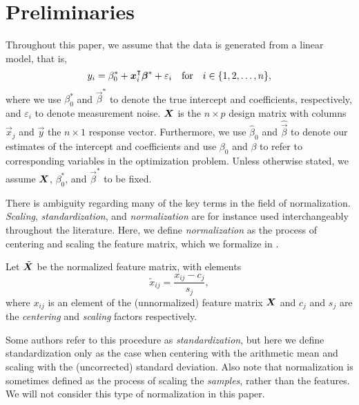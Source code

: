 \section{Preliminaries}

Throughout this paper, we assume that the data is generated from a linear model, that is,
\[
  y_i = \beta_0^* + \boldsymbol x_i^\intercal \boldsymbol\beta^* + \varepsilon_i \quad\text{for}\quad i \in \{1, 2, \dots, n\},
\]
where we use \(\beta_0^*\) and \(\vec\beta^*\) to denote the true intercept and
coefficients, respectively, and \(\varepsilon_i\) to denote measurement noise. \(\boldsymbol X\)
is the \(n \times p\) design matrix with columns \(\vec x_j\) and \(\vec y\) the \(n \times
1\) response vector. Furthermore, we use \(\hat\beta_0\) and \(\hat{\vec{\beta}}\) to
denote our estimates of the intercept and coefficients and use \(\beta_0\) and \(\beta\) to
refer to corresponding variables in the optimization problem. Unless otherwise stated, we
assume \(\boldsymbol{X}\), \(\beta_0^*\), and \(\vec{\beta}^*\) to be fixed.

There is ambiguity regarding many of the key terms in the field of normalization.
\emph{Scaling}, \emph{standardization}, and \emph{normalization} are for instance used
interchangeably throughout the literature. Here, we define \emph{normalization} as the
process of centering and scaling the feature matrix, which we formalize in
.

\begin{definition}[Normalization]
  \label{def:normalization}
  Let \(\tilde{\boldsymbol X}\) be the normalized feature matrix, with elements
  \[
    \tilde{x}_{ij} = \frac{x_{ij} - c_{j}}{s_j},
  \]
  where \(x_{ij}\) is an element of the (unnormalized) feature matrix \(\boldsymbol{X}\) and \(c_j\)
  and \(s_j\) are the \emph{centering} and \emph{scaling} factors respectively.
\end{definition}

Some authors refer to this procedure as \emph{standardization}, but here we define
standardization only as the case when centering with the arithmetic mean and scaling with
the (uncorrected) standard deviation. Also note that normalization is sometimes defined as
the process of scaling the \emph{samples}, rather than the features. We will not consider
this type of normalization in this paper.

